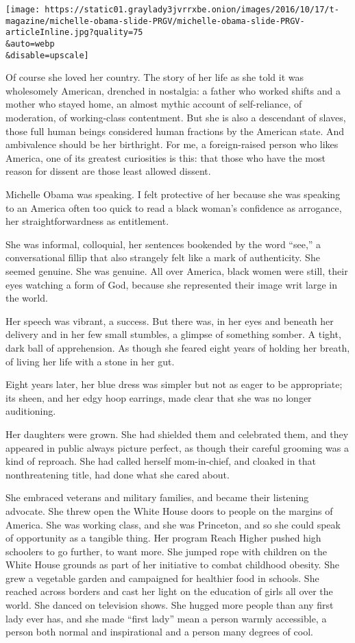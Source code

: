 \texttt{[image: https://static01.graylady3jvrrxbe.onion/images/2016/10/17/t-magazine/michelle-obama-slide-PRGV/michelle-obama-slide-PRGV-articleInline.jpg?quality=75\\\&auto=webp\\\&disable=upscale]}

Of course she loved her country. The story of her life as she told it
was wholesomely American, drenched in nostalgia: a father who worked
shifts and a mother who stayed home, an almost mythic account of
self-reliance, of moderation, of working-class contentment. But she is
also a descendant of slaves, those full human beings considered human
fractions by the American state. And ambivalence should be her
birthright. For me, a foreign-raised person who likes America, one of
its greatest curiosities is this: that those who have the most reason
for dissent are those least allowed dissent.

Michelle Obama was speaking. I felt protective of her because she was
speaking to an America often too quick to read a black woman's
confidence as arrogance, her straightforwardness as entitlement.

She was informal, colloquial, her sentences bookended by the word
``see,'' a conversational fillip that also strangely felt like a mark of
authenticity. She seemed genuine. She was genuine. All over America,
black women were still, their eyes watching a form of God, because she
represented their image writ large in the world.

Her speech was vibrant, a success. But there was, in her eyes and
beneath her delivery and in her few small stumbles, a glimpse of
something somber. A tight, dark ball of apprehension. As though she
feared eight years of holding her breath, of living her life with a
stone in her gut.

Eight years later, her blue dress was simpler but not as eager to be
appropriate; its sheen, and her edgy hoop earrings, made clear that she
was no longer auditioning.

Her daughters were grown. She had shielded them and celebrated them, and
they appeared in public always picture perfect, as though their careful
grooming was a kind of reproach. She had called herself mom-in-chief,
and cloaked in that nonthreatening title, had done what she cared about.

She embraced veterans and military families, and became their listening
advocate. She threw open the White House doors to people on the margins
of America. She was working class, and she was Princeton, and so she
could speak of opportunity as a tangible thing. Her program Reach Higher
pushed high schoolers to go further, to want more. She jumped rope with
children on the White House grounds as part of her initiative to combat
childhood obesity. She grew a vegetable garden and campaigned for
healthier food in schools. She reached across borders and cast her light
on the education of girls all over the world. She danced on television
shows. She hugged more people than any first lady ever has, and she made
``first lady'' mean a person warmly accessible, a person both normal and
inspirational and a person many degrees of cool.

